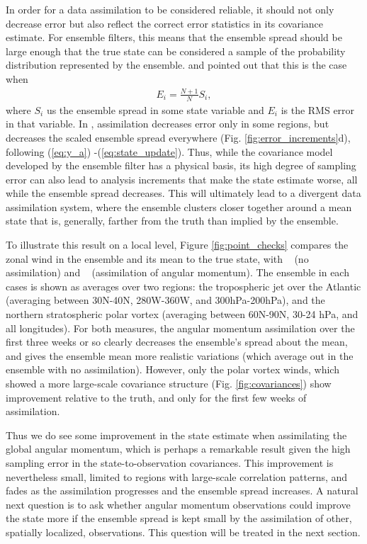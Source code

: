 In order for a data assimilation to be considered reliable, it should not only 
decrease error but also reflect the correct error statistics in its covariance 
estimate. 
For ensemble filters, this means that the ensemble spread should be large 
enough that the true state can be considered  a sample of the probability 
distribution represented by the ensemble.
 \citet{Huntley2009} and \citet{Murphy1988} pointed out that this is the case when 
 \begin{eqnarray}
	 E_i = \frac{N+1}{N} S_i, 
	 \label{eq:EvsS}
 \end{eqnarray}
 where $S_i$ us the ensemble spread in some state variable and $E_i$ is the RMS error in that variable. 
In \ERPALL, assimilation decreases error only in some regions, but 
decreases the scaled ensemble spread everywhere (Fig. \ref{fig:error_increments}d), following (\ref{eq:y_a}) -(\ref{eq:state_update}).  
Thus, while the covariance model developed by the ensemble filter has a physical basis, its high degree of sampling error can also lead to analysis increments that make the state estimate worse, all while the ensemble spread decreases.  
This will ultimately lead to a divergent data assimilation system, where the ensemble clusters closer together around a mean state that is, generally, farther from the truth than implied by the ensemble. 


To illustrate this result on a local level, Figure \ref{fig:point_checks} compares the zonal wind in the ensemble and its mean to the true state, with \NODA~ (no assimilation) and \ERPALL~ (assimilation of angular momentum). 
The ensemble in each cases is shown as averages over two regions: the tropospheric jet over the Atlantic (averaging between 30N-40N, 280W-360W, and 300hPa-200hPa), and the northern stratospheric polar vortex (averaging between 60N-90N, 30-24 hPa, and all longitudes).
For both measures, the angular momentum assimilation over the first three weeks or so clearly decreases the ensemble's spread about the mean, and gives the ensemble mean more realistic variations (which average out in the ensemble with no assimilation). 
However, only the polar vortex winds, which showed a more large-scale covariance structure (Fig. \ref{fig:covariances}) show improvement relative to the truth, and only for the first few weeks of assimilation. 

Thus we do see some improvement in the state estimate when assimilating the global angular momentum, which is perhaps a remarkable result given the high sampling error in the state-to-observation covariances. 
This improvement is nevertheless small, limited to regions with large-scale correlation patterns, and fades as the assimilation progresses and the ensemble spread increases.
A natural next question is to ask whether angular momentum observations could improve the state more if the ensemble spread is kept small by the assimilation of other, spatially localized, observations. 
This question will be treated in the next section.  
